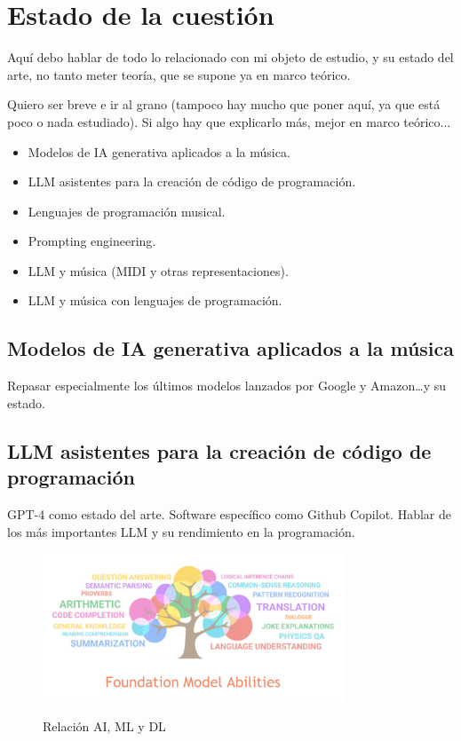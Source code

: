 \chapter{Estado de la cuestión}
\label{chap:estado_cuestion}

Aquí debo hablar de todo lo relacionado con mi objeto de estudio, y su estado del arte, no tanto meter teoría, que se supone ya en marco teórico.

Quiero ser breve e ir al grano (tampoco hay mucho que poner aquí, ya que está poco o nada estudiado). Si algo hay que explicarlo más, mejor en marco teórico...


\begin{itemize}
    \item Modelos de IA generativa aplicados a la música.
    \item LLM asistentes para la creación de código de programación.
    \item Lenguajes de programación musical.
    \item Prompting engineering.
    \item LLM y música (MIDI y otras representaciones).
    \item LLM y música con lenguajes de programación.
\end{itemize}

\section{Modelos de IA generativa aplicados a la música}
    Repasar especialmente los últimos modelos lanzados por Google y Amazon\dots y su estado.

\section{LLM asistentes para la creación de código de programación}
\label{sec:llm_asistentes_creacion_codigo_programacion}
    GPT-4 como estado del arte. Software específico como Github Copilot. Hablar de los más importantes LLM y su rendimiento en la programación.


    \begin{figure}[h]
        \caption{Relación AI, ML y DL}
        \centering
        \includegraphics[width=0.8\textwidth]{./figuras/fundation_models_habilities.png}
        \label{fig:fundation_models_habilities}
    \end{figure}

